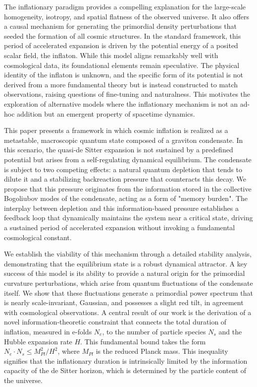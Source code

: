 \documentclass[]{article}
\begin{document}
The inflationary paradigm provides a compelling explanation for the large-scale homogeneity, isotropy, and spatial flatness of the observed universe. It also offers a causal mechanism for generating the primordial density perturbations that seeded the formation of all cosmic structures. In the standard framework, this period of accelerated expansion is driven by the potential energy of a posited scalar field, the inflaton. While this model aligns remarkably well with cosmological data, its foundational elements remain speculative. The physical identity of the inflaton is unknown, and the specific form of its potential is not derived from a more fundamental theory but is instead constructed to match observations, raising questions of fine-tuning and naturalness. This motivates the exploration of alternative models where the inflationary mechanism is not an ad-hoc addition but an emergent property of spacetime dynamics.

This paper presents a framework in which cosmic inflation is realized as a metastable, macroscopic quantum state composed of a graviton condensate. In this scenario, the quasi-de Sitter expansion is not sustained by a predefined potential but arises from a self-regulating dynamical equilibrium. The condensate is subject to two competing effects: a natural quantum depletion that tends to dilute it and a stabilizing backreaction pressure that counteracts this decay. We propose that this pressure originates from the information stored in the collective Bogoliubov modes of the condensate, acting as a form of "memory burden". The interplay between depletion and this information-based pressure establishes a feedback loop that dynamically maintains the system near a critical state, driving a sustained period of accelerated expansion without invoking a fundamental cosmological constant.

We establish the viability of this mechanism through a detailed stability analysis, demonstrating that the equilibrium state is a robust dynamical attractor. A key success of this model is its ability to provide a natural origin for the primordial curvature perturbations, which arise from quantum fluctuations of the condensate itself. We show that these fluctuations generate a primordial power spectrum that is nearly scale-invariant, Gaussian, and possesses a slight red tilt, in agreement with cosmological observations. A central result of our work is the derivation of a novel information-theoretic constraint that connects the total duration of inflation, measured in e-folds $N_e$, to the number of particle species $N_s$ and the Hubble expansion rate $H$. This fundamental bound takes the form $N_e \cdot N_s \leq M_{Pl}^2/H^2$, where $M_{Pl}$ is the reduced Planck mass. This inequality signifies that the inflationary duration is intrinsically limited by the information capacity of the de Sitter horizon, which is determined by the particle content of the universe.
\end{document}
